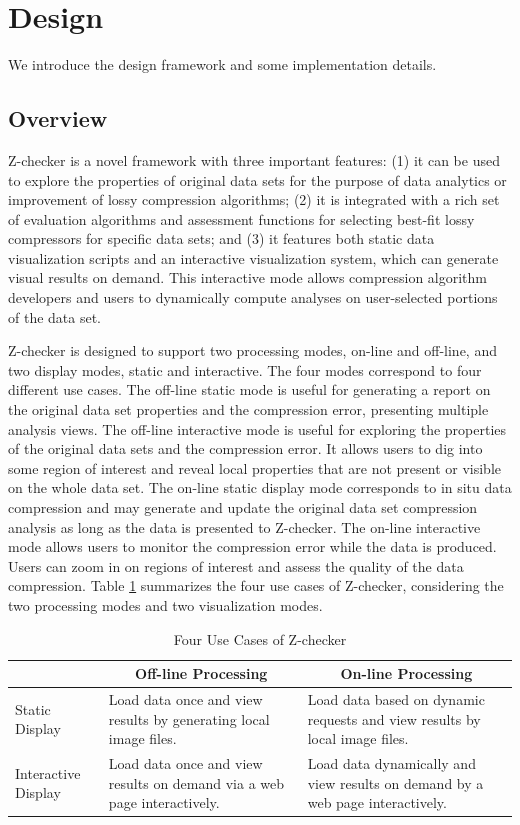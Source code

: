 \section{Design}

We introduce the design framework and some implementation details.

\subsection{Overview}
Z-checker is a novel framework with three important features: (1) it can be used to explore the properties of original data sets for the purpose of data analytics or improvement of lossy compression algorithms; (2) it is integrated with a rich set of evaluation algorithms and assessment functions for selecting best-fit lossy compressors for specific data sets; and (3) it features both static data visualization scripts and an interactive visualization system, which can generate visual results on demand. This interactive mode allows compression algorithm developers and users to dynamically compute analyses on user-selected portions of the data set.

Z-checker is designed to support two processing modes, on-line and off-line, and two display modes, static and interactive. The four modes correspond to four different use cases. The off-line static mode is useful for generating a report on the original data set properties and the compression error, presenting multiple analysis views. The off-line interactive mode is useful for exploring the properties of the original data sets and the compression error. It allows users to dig into some region of interest and reveal local properties that are not present or visible on the whole data set. The on-line static display mode corresponds to in situ data compression and may generate and update the original data set compression analysis as long as the data is presented to Z-checker. The on-line interactive mode allows users to monitor the compression error while the data is produced. Users can zoom in on regions of interest and assess the quality of the data compression. Table \ref{tab:modes} summarizes the four use cases of Z-checker, considering the two processing modes and two visualization modes.

\begin{table}[ht] \centering
\caption{Four Use Cases of Z-checker} \centering
\scriptsize
\begin{tabular}{|l|p{}|p{}|}
\hline \multicolumn{1}{|c|}{} & \multicolumn{1}{|c|}{Off-line Processing}&\multicolumn{1}{|c|}{On-line Processing}\\
\hline
Static Display & Load data once and view results by generating local image files. & Load data based on dynamic requests and view results by  local image files.\\
\hline
Interactive Display & Load data once and view results on demand via a web page interactively. & Load data dynamically and view results on demand by a web page interactively. \\
\hline
\end{tabular}
\label{tab:modes}
\end{table}

